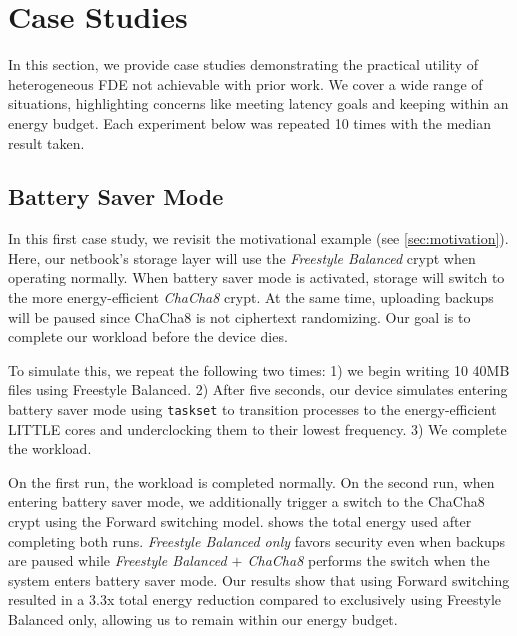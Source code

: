 \section{Case Studies}\label{sec:usecases}

In this section, we provide \numCases case studies demonstrating the practical
utility of heterogeneous FDE not achievable with prior work. We cover a wide
range of situations, highlighting concerns like meeting latency goals and
keeping within an energy budget. Each experiment below was repeated 10 times
with the median result taken.


\subsection{Battery Saver Mode}\label{subsec:usecase-battery}

In this first case study, we revisit the motivational example (see
\cref{sec:motivation}). Here, our netbook's storage layer will use the {\em
Freestyle Balanced} crypt when operating normally. When battery saver mode is
activated, storage will switch to the more energy-efficient {\em ChaCha8} crypt.
At the same time, uploading backups will be paused since ChaCha8 is not
ciphertext randomizing. Our goal is to complete our workload before the device
dies.

To simulate this, we repeat the following two times: 1) we begin
writing 10 40MB files using Freestyle Balanced. 2) After five seconds, our
device simulates entering battery saver mode using \texttt{taskset} to
transition \sys processes to the energy-efficient LITTLE cores and underclocking
them to their lowest frequency. 3) We complete the workload.



On the first run, the workload is completed normally. On the second run, when
entering battery saver mode, we additionally trigger a switch to the ChaCha8
crypt using the Forward switching model.  shows the
total energy used after completing both runs. {\em Freestyle Balanced only}
favors security even when backups are paused while {\em Freestyle Balanced $+$
ChaCha8} performs the switch when the system enters battery saver mode. Our
results show that using Forward switching resulted in a 3.3x total energy
reduction compared to exclusively using Freestyle Balanced only, allowing us to
remain within our energy budget.


